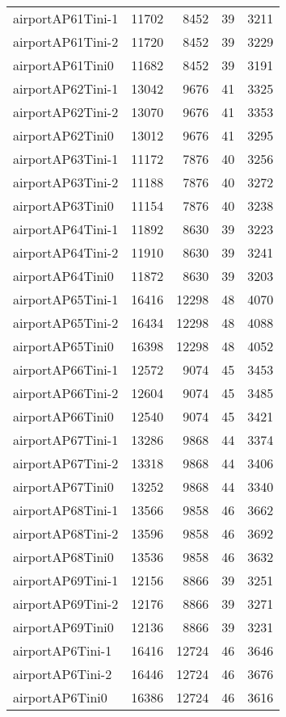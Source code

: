\begin{tabular}{lrrrr}
airportAP61Tini-1 & 11702 & 8452 & 39 & 3211 \\
airportAP61Tini-2 & 11720 & 8452 & 39 & 3229 \\
airportAP61Tini0 & 11682 & 8452 & 39 & 3191 \\
airportAP62Tini-1 & 13042 & 9676 & 41 & 3325 \\
airportAP62Tini-2 & 13070 & 9676 & 41 & 3353 \\
airportAP62Tini0 & 13012 & 9676 & 41 & 3295 \\
airportAP63Tini-1 & 11172 & 7876 & 40 & 3256 \\
airportAP63Tini-2 & 11188 & 7876 & 40 & 3272 \\
airportAP63Tini0 & 11154 & 7876 & 40 & 3238 \\
airportAP64Tini-1 & 11892 & 8630 & 39 & 3223 \\
airportAP64Tini-2 & 11910 & 8630 & 39 & 3241 \\
airportAP64Tini0 & 11872 & 8630 & 39 & 3203 \\
airportAP65Tini-1 & 16416 & 12298 & 48 & 4070 \\
airportAP65Tini-2 & 16434 & 12298 & 48 & 4088 \\
airportAP65Tini0 & 16398 & 12298 & 48 & 4052 \\
airportAP66Tini-1 & 12572 & 9074 & 45 & 3453 \\
airportAP66Tini-2 & 12604 & 9074 & 45 & 3485 \\
airportAP66Tini0 & 12540 & 9074 & 45 & 3421 \\
airportAP67Tini-1 & 13286 & 9868 & 44 & 3374 \\
airportAP67Tini-2 & 13318 & 9868 & 44 & 3406 \\
airportAP67Tini0 & 13252 & 9868 & 44 & 3340 \\
airportAP68Tini-1 & 13566 & 9858 & 46 & 3662 \\
airportAP68Tini-2 & 13596 & 9858 & 46 & 3692 \\
airportAP68Tini0 & 13536 & 9858 & 46 & 3632 \\
airportAP69Tini-1 & 12156 & 8866 & 39 & 3251 \\
airportAP69Tini-2 & 12176 & 8866 & 39 & 3271 \\
airportAP69Tini0 & 12136 & 8866 & 39 & 3231 \\
airportAP6Tini-1 & 16416 & 12724 & 46 & 3646 \\
airportAP6Tini-2 & 16446 & 12724 & 46 & 3676 \\
airportAP6Tini0 & 16386 & 12724 & 46 & 3616 \\

\end{tabular}

